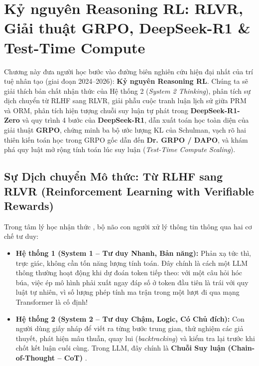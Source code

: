 ﻿\chapter{Kỷ nguyên Reasoning RL: RLVR, Giải thuật GRPO, DeepSeek-R1 \& Test-Time Compute}
\label{chap:reasoning_rl_grpo}

\begin{pedagogy}
Chương này đưa người học bước vào đường biên nghiên cứu hiện đại nhất của trí tuệ nhân tạo (giai đoạn 2024--2026): \textbf{Kỷ nguyên Reasoning RL}. Chúng ta sẽ giải thích bản chất nhận thức của Hệ thống 2 (\textit{System 2 Thinking}), phân tích sự dịch chuyển từ RLHF sang RLVR, giải phẫu cuộc tranh luận lịch sử giữa PRM và ORM, phân tích hiện tượng chuỗi suy luận tự phát trong \textbf{DeepSeek-R1-Zero} và quy trình 4 bước của \textbf{DeepSeek-R1}, dẫn xuất toán học toàn diện của giải thuật \textbf{GRPO}, chứng minh ba bộ ước lượng KL của Schulman, vạch rõ hai thiên kiến toán học trong GRPO gốc dẫn đến \textbf{Dr. GRPO / DAPO}, và khám phá quy luật mở rộng tính toán lúc suy luận (\textit{Test-Time Compute Scaling}).
\end{pedagogy}

\section{Sự Dịch chuyển Mô thức: Từ RLHF sang RLVR (Reinforcement Learning with Verifiable Rewards)}
\label{sec:rlvr_shift}

Trong tâm lý học nhận thức \citep{kahneman2011thinking}, bộ não con người xử lý thông tin thông qua hai cơ chế tư duy:
\begin{itemize}[leftmargin=1.2cm]
    \item \textbf{Hệ thống 1 (System 1 -- Tư duy Nhanh, Bản năng):} Phản xạ tức thì, trực giác, không cần tốn năng lượng tính toán. Đây chính là cách một LLM thông thường hoạt động khi dự đoán token tiếp theo: với một câu hỏi hóc búa, việc ép mô hình phải xuất ngay đáp số ở token đầu tiên là trái với quy luật tự nhiên, vì số lượng phép tính ma trận trong một lượt đi qua mạng Transformer là cố định!
    \item \textbf{Hệ thống 2 (System 2 -- Tư duy Chậm, Logic, Có Chủ đích):} Con người dùng giấy nháp để viết ra từng bước trung gian, thử nghiệm các giả thuyết, phát hiện mâu thuẫn, quay lui (\textit{backtracking}) và kiểm tra lại trước khi chốt kết luận cuối cùng. Trong LLM, đây chính là \textbf{Chuỗi Suy luận (Chain-of-Thought -- CoT)} \citep{wei2022chain}.
\end{itemize}

